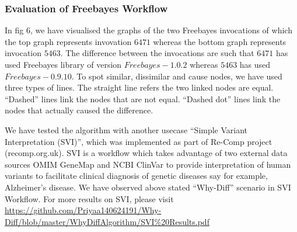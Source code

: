 \documentclass[10pt,conference,twocolumn]{IEEEtran}
\begin{document}
\subsubsection{Evaluation of Freebayes Workflow}
In fig 6, we have visualised the graphs of the two Freebayes invocations of which the top graph represents invovation $6471$ whereas the bottom graph represents invocation $5463$. The difference between the invocations are such that $6471$ has used Freebayes library of version $Freebayes-1.0.2$ whereas $5463$ has used $Freebayes-0.9.10$. To spot similar, dissimilar and cause nodes, we have used three types of lines. The straight line refers the two linked nodes are equal. \enquote{Dashed} lines link the nodes that are not equal. \enquote{Dashed dot} lines link the nodes that actually caused the difference. 

We have tested the algorithm with another usecase \enquote{Simple Variant Interpretation (SVI)}, which was implemented as part of Re-Comp  project (recomp.org.uk). SVI is a workflow which takes advantage of two external data sources OMIM GeneMap and NCBI ClinVar to provide interpretation of human variants to facilitate clinical diagnosis of genetic diseases say for example, Alzheimer's disease. We have observed above stated “Why-Diff” scenario in SVI Workflow. For more results on SVI, please visit  \url{https://github.com/Priyaa140624191/Why-Diff/blob/master/WhyDiffAlgorithm/SVI%20Results.pdf}
\end{document}
